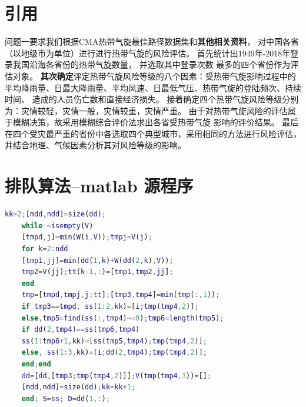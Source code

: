 \documentclass[withoutpreface,bwprint]{cumcmthesis} %
\begin{document}
\newpage
\begin{appendices}
\section{引用}
  问题一要求我们根据CMA热带气旋最佳路径数据集和{\bfseries\heiti 其他相关资料}，
对中国各省（以地级市为单位）{\cu 进行}进行热带气旋的风险评估。
首先统计出1949年-2018年登录我国沿海各省份的热带气旋数量，
并选取其中登录次数 最多的四个省份作为评估对象。
{\bfseries 其次确定}评定热带气旋风险等级的八个因素：{\cu 受热带气旋}影响过程中的
平均降雨量、{\chu 日最大}降雨量、平均风速、日最低气压、热带气旋的登陆频次、持续时间、
造成的人员伤亡数和直接经济损失。
接着确定四个热带气旋风险等级分别为：灾情较轻，灾情一般，灾情较重，灾情严重。
由于对热带气旋风险的评估属于模糊决策，故采用模糊综合评价法求出各省受热带气旋
影响的评价结果。\cite{bib:one}
最后在四个受灾最严重的省份中各选取四个典型城市，采用相同的方法进行风险评估，
并结合地理、气候因素分析其对风险等级的影响。

\section{排队算法--matlab 源程序}
    \begin{lstlisting}[language=matlab]
    kk=2;[mdd,ndd]=size(dd);
    while ~isempty(V)
    [tmpd,j]=min(W(i,V));tmpj=V(j);
    for k=2:ndd
    [tmp1,jj]=min(dd(1,k)+W(dd(2,k),V));
    tmp2=V(jj);tt(k-1,:)=[tmp1,tmp2,jj];
    end
    tmp=[tmpd,tmpj,j;tt];[tmp3,tmp4]=min(tmp(:,1));
    if tmp3==tmpd, ss(1:2,kk)=[i;tmp(tmp4,2)];
    else,tmp5=find(ss(:,tmp4)~=0);tmp6=length(tmp5);
    if dd(2,tmp4)==ss(tmp6,tmp4)
    ss(1:tmp6+1,kk)=[ss(tmp5,tmp4);tmp(tmp4,2)];
    else, ss(1:3,kk)=[i;dd(2,tmp4);tmp(tmp4,2)];
    end;end
    dd=[dd,[tmp3;tmp(tmp4,2)]];V(tmp(tmp4,3))=[];
    [mdd,ndd]=size(dd);kk=kk+1;
    end; S=ss; D=dd(1,:);
    \end{lstlisting}


\end{appendices}
\end{document}
